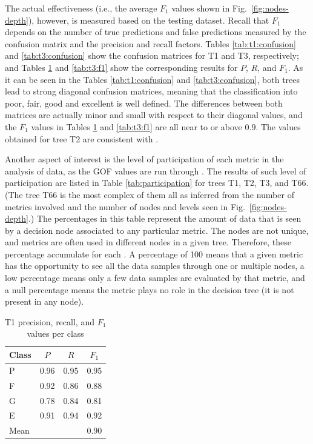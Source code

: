 The actual effectiveness (i.e., the average $F_1$ values shown in Fig.~\ref{fig:nodes-depth}), however, is measured based on the testing dataset. Recall that $F_1$ depends on the number of true predictions and false predictions measured by the confusion matrix and the precision and recall factors. Tables \ref{tab:t1:confusion} and \ref{tab:t3:confusion} show the confusion matrices for T1 and T3, respectively; and Tables \ref{tab:t1:f1} and \ref{tab:t3:f1} show the corresponding results for $P$, $R$, and $F_1$. As it can be seen in the Tables \ref{tab:t1:confusion} and \ref{tab:t3:confusion}, both trees lead to strong diagonal confusion matrices, meaning that the classification into poor, fair, good and excellent is well defined. The differences between both matrices are actually minor and small with respect to their diagonal values, and the $F_1$ values in Tables \ref{tab:t1:f1} and \ref{tab:t3:f1} are all near to or above 0.9. The values obtained for tree T2 are consistent with .

Another aspect of interest is the level of participation of each metric in the analysis of data, as the GOF values are run through . The results of such level of participation are listed in Table \ref{tab:participation} for trees T1, T2, T3, and T66. (The tree T66 is the most complex of them all as inferred from the number of metrics involved and the number of nodes and levels seen in Fig.~\ref{fig:nodes-depth}.) The percentages in this table represent the amount of data that is seen by a decision node associated to any particular metric. The nodes are not unique, and metrics are often used in different nodes in a given tree. Therefore, these percentage accumulate for each . A percentage of 100 means that a given metric has the opportunity to see all the data samples through one or multiple nodes, a low percentage means only a few data samples are evaluated by that metric, and a null percentage means the metric plays no role in the decision tree (it is not present in any node).

\begin{table}[t]
	\centering
	\caption{T1 precision, recall, and $F_1$ values per class}
	\label{tab:t1:f1}
	\small
	\begin{tabular}{lccc}
	Class   & $P$	& $R$  	& $F_1$ \\ 
	\hline
	P 		& 0.96 	& 0.95 	& 0.95 	\\
	F 		& 0.92 	& 0.86 	& 0.88 	\\
	G 		& 0.78 	& 0.84 	& 0.81 	\\
	E 		& 0.91 	& 0.94 	& 0.92 	\\
	\hline
	Mean 	&		&		& 0.90	\\
	\end{tabular}
\end{table}

